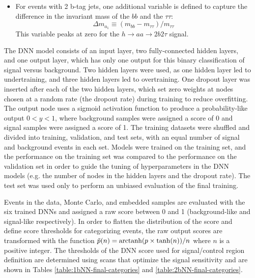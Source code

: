 \begin{itemize}
    \item For events with 2 b-tag jets, one additional variable is defined to capture the difference in the invariant mass of the $bb$ and the $\tau\tau$:
        \begin{equation}
            \Delta m_{a_1} \equiv (m_{bb} - m_{\tau\tau})/{m_{\tau\tau}}
        \end{equation}
    This variable peaks at zero for the $h\rightarrow aa \rightarrow 2b2\tau$ signal.
\end{itemize}

The DNN model consists of an input layer, two fully-connected hidden layers, and one output layer, which has only one output for this binary classification of signal versus background. Two hidden layers were used, as one hidden layer led to undertraining, and three hidden layers led to overtraining. One dropout layer was inserted after each of the two hidden layers, which set zero weights at nodes chosen at a random rate (the dropout rate) during training to reduce overfitting. The output node uses a sigmoid activation function to produce a probability-like output $0 < y < 1$, where background samples were assigned a score of 0 and signal samples were assigned a score of 1. The training datasets were shuffled and divided into training, validation, and test sets, with an equal number of signal and background events in each set. Models were trained on the training set, and the performance on the training set was compared to the performance on the validation set in order to guide the tuning of hyperparameters in the DNN models (e.g. the number of nodes in the hidden layers and the dropout rate). The test set was used only to perform an unbiased evaluation of the final training.

Events in the data, Monte Carlo, and embedded samples are evaluated with the six trained DNNs and assigned a raw score between 0 and 1 (background-like and signal-like respectively). In order to flatten the distribution of the score and define score thresholds for categorizing events, the raw output scores are transformed with the function $\tilde{p}(n) = \operatorname{arctanh}(p \times \tanh(n))/n$ where $n$ is a positive integer. The thresholds of the DNN score used for signal/control region definition are determined using scans that optimize the signal sensitivity and are shown in Tables \ref{table:1bNN-final-categories} and \ref{table:2bNN-final-categories}.

